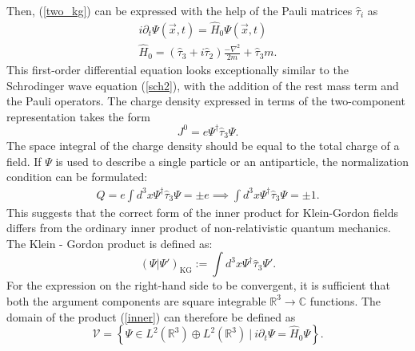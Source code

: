 \documentclass[11pt]{article}
\numberwithin{equation}{section}
\begin{document}
     Then, (\ref{two_kg}) can be expressed with the help of the Pauli matrices $\hat\tau_i$ as
     \begin{gather}
       i \partial_t \Psi(\vec x,t) = \hat H_0 \Psi(\vec x,t)\\ \label{kg_sch}
       \hat H_0 = (\hat\tau_3 + i\hat\tau_2) \frac{- \nabla^2}{2m} + \hat\tau_3 m.
     \end{gather}
     This first-order differential equation looks exceptionally similar to the Schrodinger wave equation (\ref{sch2}), with the addition of the rest mass term and the Pauli operators.
     The charge density expressed in terms of the two-component representation takes the form
     \begin{equation}
       J^0 = e \Psi^\dagger \hat \tau_3 \Psi.
     \end{equation}
     The space integral of the charge density should be equal to the total charge of a field.
     If $\Psi$ is used to describe a single particle or an antiparticle, the normalization
     condition can be formulated:
     \begin{gather}
       Q = e \int d^3x \Psi^\dagger \hat \tau_3 \Psi = \pm e \implies \int d^3x \Psi^\dagger \hat \tau_3 \Psi = \pm 1.
     \end{gather}
     This suggests that the correct form of the inner product for Klein-Gordon fields differs from the ordinary inner product
     of non-relativistic quantum mechanics. The Klein - Gordon product is defined as:
     \begin{equation}
       (\Psi | \Psi')_{\text{KG}} := \int d^3 x \Psi^\dagger \hat \tau_3 \Psi' \label{inner}.
     \end{equation}
     For the expression on the right-hand side to be convergent, it is sufficient that both the argument
     components are square integrable $\mathbb{R}^3 \rightarrow \mathbb{C}$ functions. The domain
     of the product (\ref{inner}) can therefore be defined as
     \begin{equation}
       \mathcal{V} = \left\{ \Psi \in L^2(\mathbb{R}^3) \oplus L^2(\mathbb{R}^3) \ | \ i \partial_t \Psi = \hat H_0 \Psi \right\}.
     \end{equation}
\end{document}
